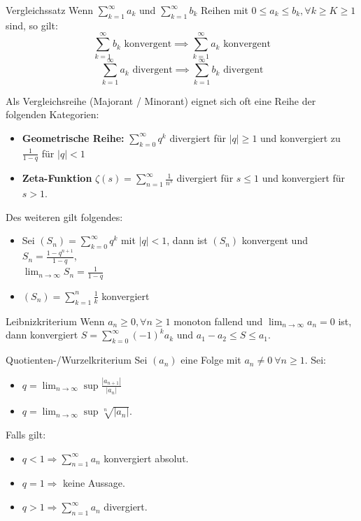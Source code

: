 \documentclass[a4paper,8pt]{extarticle}
\def\limn{\lim_{n\to \infty}}
\def\sumk{\sum_{k=1}^\infty}
\begin{document}
\begin{mainbox}{Vergleichssatz}
Wenn $\sumk a_k$ und $\sumk b_k$ Reihen mit $0 \le a_k \le b_k, \forall k \ge K \ge 1$ sind, so gilt:
$$\sumk b_k \text{ konvergent} \implies \sumk a_k \text{ konvergent}$$ 
$$\sumk a_k \text{ divergent} \implies \sumk b_k \text{ divergent}$$ 
\end{mainbox}

Als Vergleichsreihe (Majorant / Minorant) eignet sich oft eine Reihe der folgenden Kategorien:
\begin{itemize}
  \item \textbf{Geometrische Reihe:} 
  $\sum_{k=0}^\infty q^k$ divergiert für $|q| \ge 1$ und konvergiert zu $\frac{1}{1 - q}$ für $|q| < 1$
  \item \textbf{Zeta-Funktion}
  $\zeta(s) = \sum_{n=1}^\infty \frac{1}{n^s}$ divergiert für $s \le 1$ und konvergiert für $s > 1$.
\end{itemize}

Des weiteren gilt folgendes:
\begin{itemize}
  \item Sei $(S_n) = \sum_{k=0}^\infty q^k$ mit $|q| < 1$, dann ist $(S_n)$ konvergent und $S_n = \frac{1 - q^{n+1}}{1-q}$, \\ $\limn S_n = \frac{1}{1-q}$
  \item $(S_n) = \sum_{k=1}^n \frac{1}{k}$ konvergiert
\end{itemize}

\begin{mainbox}{Leibnizkriterium}
Wenn $a_n \ge 0, \forall n \ge 1$ monoton fallend und $\limn a_n = 0$ ist, dann konvergiert $S = \sum_{k=0}^\infty (-1)^{k} a_k$ und $a_1 - a_2 \le S \le a_1$.
\end{mainbox}

\begin{mainbox}{Quotienten-/Wurzelkriterium}
Sei $(a_n)$ eine Folge mit $a_n \ne 0 \ \forall n \ge 1$. Sei:
\begin{itemize}[nosep]
  \item  $q = \limn \sup \frac{|a_{n+1}|}{|a_n|}$
  \item  $q = \limn \sup \sqrt[n]{|a_n|}$. 
\end{itemize}
Falls gilt:
\begin{itemize}[nosep]
 \item $q < 1 \Rightarrow \sum_{n=1}^\infty a_n$ konvergiert absolut.
 \item $q = 1 \Rightarrow$ keine Aussage.
 \item $q > 1 \Rightarrow \sum_{n=1}^\infty a_n$ divergiert.
\end{itemize}
\end{mainbox}
\end{document}

